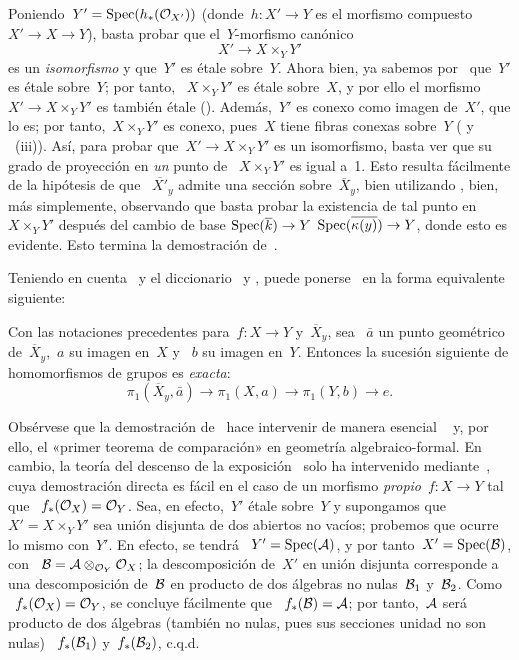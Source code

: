 Poniendo~$Y'=\Spec(h_*(\cal{O}_{X'}))$ (donde~$h\colon X'\to Y$ es el
morfismo compuesto~$X'\to X\to Y$), basta probar que el~$Y$-morfismo canónico
$$
X'\to X\times_Y Y'
$$
es un \emph{isomorfismo} y que~$Y'$ es étale sobre~$Y$. Ahora bien, ya sabemos
por~ que~$Y'$ es étale sobre~$Y$; por tanto,
~$X\times_Y Y'$ es étale sobre~$X$, y por ello el morfismo
~$X'\to X\times_Y Y'$ es también étale (). Además,~$Y'$ es
conexo como imagen de~$X'$, que lo es; por tanto,~$X\times_Y Y'$ es conexo,
pues~$X$ tiene fibras conexas sobre~$Y$ ( y
~(iii)). Así, para probar que~$X'\to X\times_Y Y'$ es un
isomorfismo, basta ver que su grado de proyección en \emph{un} punto de
~$X\times_Y Y'$ es igual a~1. Esto resulta fácilmente de la hipótesis de que
~$\overline{X'}_y$ admite una sección sobre~$\overline X_y$, bien utilizando
, bien, más simplemente, observando que basta probar la
existencia de tal punto en~$X\times_Y Y'$ después del cambio de base
{$\Spec(\overline k)\to Y$}
{$\Spec(\overline{\kres(y)})\to Y$}, donde esto es evidente.
Esto termina la demostración de~.

Teniendo en cuenta~ y el diccionario~ y
, puede ponerse~ en la forma equivalente siguiente:

\begin{corollaire}
\label{X.1.4}
Con las notaciones precedentes para~$f\colon X\to Y$ y~$\overline X_y$, sea
~$\bar{a}$ un punto geométrico de~$\overline X_y$,~$a$ su imagen en~$X$ y
~$b$ su imagen en~$Y$. Entonces la sucesión siguiente de homomorfismos de
grupos es \emph{exacta}:
$$
\pi_1(\overline X_y,\bar{a})\to \pi_1(X,a)\to \pi_1(Y,b)\to e.
$$
\end{corollaire}

\begin{remarques}
\label{X.1.5}
Obsérvese que la demostración de~ hace intervenir de manera esencial
~ y, por ello, el «primer teorema de comparación» en geometría
algebraico-formal. En cambio, la teoría del descenso de la exposición~
solo ha intervenido mediante~, cuya demostración directa es
fácil en el caso de un morfismo \emph{propio}~$f\colon X\to Y$ tal que
~$f_*(\cal{O}_X)=\cal{O}_Y$. Sea, en efecto,~$Y'$ étale sobre~$Y$ y
supongamos que~$X'=X\times_Y Y'$ sea unión disjunta de dos abiertos no vacíos;
probemos que ocurre lo mismo con~$Y'$. En efecto, se tendrá
~$Y'=\Spec(\cal{A})$, y por tanto~$X'=\Spec(\cal{B})$, con
~$\cal{B}=\cal{A}\otimes_{\cal{O}_Y}\cal{O}_X$; la descomposición de~$X'$ en
unión disjunta corresponde a una descomposición de~$\cal{B}$ en producto de
dos álgebras no nulas~$\cal{B}_1$ y~$\cal{B}_2$. Como
~$f_*(\cal{O}_X)=\cal{O}_Y$, se concluye fácilmente que
~$f_*(\cal{B})=\cal{A}$; por tanto,~$\cal{A}$ será producto de dos álgebras
(también no nulas, pues sus secciones unidad no son nulas)
~$f_*(\cal{B}_1)$ y~$f_*(\cal{B}_2)$, c.q.d.
\end{remarques}
